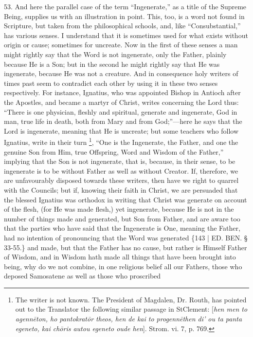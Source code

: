 53. And here the parallel case
of the term ``Ingenerate,'' as a title of the Supreme Being, supplies us
with an illustration in point. This, too, is a word not found in
Scripture, but taken from the philosophical schools, and, like ``Consubstantial,''
has various senses. I understand that it is sometimes used for what
exists without origin or cause; sometimes for uncreate. Now in the
first of these senses a man might rightly say that the Word is
not ingenerate, only the Father, plainly because He is a Son; but in
the second he might rightly say that He was ingenerate, because He was
not a creature. And in consequence holy writers of times past seem to
contradict each other by using it in these two senses respectively.
For instance, Ignatius, who was appointed Bishop in Antioch after the
Apostles, and became a martyr of Christ, writes concerning the Lord
thus: ``There is one physician, fleshly and spiritual, generate and
ingenerate, God in man, true life in death, both from Mary and from
God;''—here he says that the Lord is ingenerate, meaning that He is
uncreate; but some teachers who follow Ignatius, write in their turn \footnote{The writer is not known. The President of Magdalen, Dr. Routh, has
pointed out to the Translator the following similar passage in St\emph{}Clement:
[\emph{hen men to agenn\={e}ton, ho pantokrat\={o}r theos, hen de
kai to progenn\={e}then di' ou ta panta egeneto, kai ch\={o}ris
autou egeneto oude hen}]. Strom. vi. 7, p. 769.}, ``One is the Ingenerate, the Father, and one the genuine Son
from Him, true Offspring, Word and Wisdom of the Father,'' implying
that the Son is not ingenerate, that is, because, in their sense, to
be ingenerate is to be without Father as well as without Creator. If,
therefore, we are unfavourably disposed towards these writers, then
have we right to quarrel with the Councils; but if, knowing their
faith in Christ, we are persuaded that the blessed Ignatius was
orthodox in writing that Christ was generate on account of the flesh,
(for He was made flesh,) yet ingenerate, because He is not in the
number of things made and generated, but Son from Father, and are
aware too that the parties who have said that the Ingenerate is One,
meaning the Father, had no intention of pronouncing that the Word was
generated \{143 | ED. BEN. § 33-55.\} and
made, but that the Father has no cause, but rather is Himself Father
of Wisdom, and in Wisdom hath made all things that have been brought
into being, why do we not combine, in one religious belief all our
Fathers, those who deposed Samosatene as well as those who proscribed
